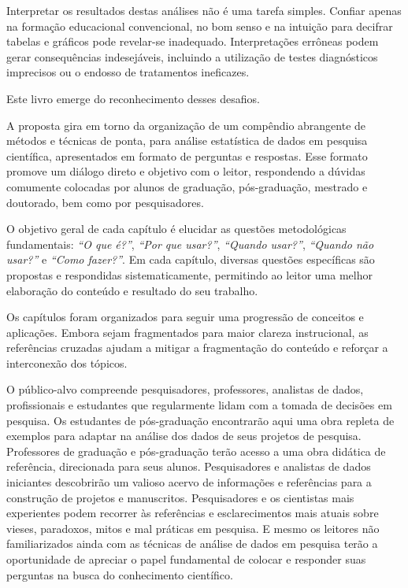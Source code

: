 \documentclass[
  a4paper,
]{book}
\begin{document}
Interpretar os resultados destas análises não é uma tarefa simples. Confiar apenas na formação educacional convencional, no bom senso e na intuição para decifrar tabelas e gráficos pode revelar-se inadequado. Interpretações errôneas podem gerar consequências indesejáveis, incluindo a utilização de testes diagnósticos imprecisos ou o endosso de tratamentos ineficazes.

Este livro emerge do reconhecimento desses desafios.

A proposta gira em torno da organização de um compêndio abrangente de métodos e técnicas de ponta, para análise estatística de dados em pesquisa científica, apresentados em formato de perguntas e respostas. Esse formato promove um diálogo direto e objetivo com o leitor, respondendo a dúvidas comumente colocadas por alunos de graduação, pós-graduação, mestrado e doutorado, bem como por pesquisadores.

O objetivo geral de cada capítulo é elucidar as questões metodológicas fundamentais: \emph{``O que é?''}, \emph{``Por que usar?''}, \emph{``Quando usar?''}, \emph{``Quando não usar?''} e \emph{``Como fazer?''}. Em cada capítulo, diversas questões específicas são propostas e respondidas sistematicamente, permitindo ao leitor uma melhor elaboração do conteúdo e resultado do seu trabalho.

Os capítulos foram organizados para seguir uma progressão de conceitos e aplicações. Embora sejam fragmentados para maior clareza instrucional, as referências cruzadas ajudam a mitigar a fragmentação do conteúdo e reforçar a interconexão dos tópicos.

O público-alvo compreende pesquisadores, professores, analistas de dados, profissionais e estudantes que regularmente lidam com a tomada de decisões em pesquisa. Os estudantes de pós-graduação encontrarão aqui uma obra repleta de exemplos para adaptar na análise dos dados de seus projetos de pesquisa. Professores de graduação e pós-graduação terão acesso a uma obra didática de referência, direcionada para seus alunos. Pesquisadores e analistas de dados iniciantes descobrirão um valioso acervo de informações e referências para a construção de projetos e manuscritos. Pesquisadores e os cientistas mais experientes podem recorrer às referências e esclarecimentos mais atuais sobre vieses, paradoxos, mitos e mal práticas em pesquisa. E mesmo os leitores não familiarizados ainda com as técnicas de análise de dados em pesquisa terão a oportunidade de apreciar o papel fundamental de colocar e responder suas perguntas na busca do conhecimento científico.
\end{document}
